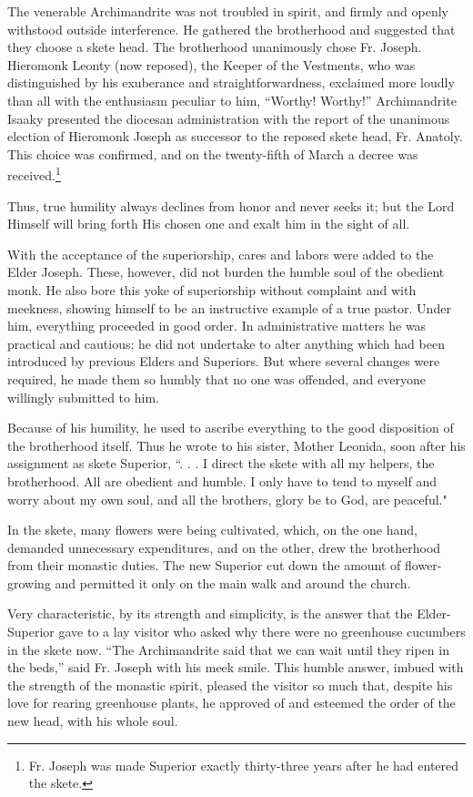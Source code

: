 The venerable Archimandrite was not troubled in spirit, and firmly and openly withstood outside interference. He gathered the brotherhood and suggested that they choose a skete head. The brotherhood unanimously chose Fr. Joseph. Hieromonk Leonty (now reposed), the Keeper of the Vestments, who was distinguished by his exuberance and straightforwardness, exclaimed more loudly than all with the enthusiasm peculiar to him, “Worthy! Worthy!” Archimandrite Isaaky presented the diocesan administration with the report of the unanimous election of Hieromonk Joseph as successor to the reposed skete head, Fr. Anatoly. This choice was confirmed, and on the twenty-fifth of March a decree was received.\footnote{Fr. Joseph was made Superior exactly thirty-three years after he had entered the skete.}

Thus, true humility always declines from honor and never seeks it; but the Lord Himself will bring forth His chosen one and exalt him in the sight of all.

With the acceptance of the superiorship, cares and labors were added to the Elder Joseph. These, however, did not burden the humble soul of the obedient monk. He also bore this yoke of superiorship without complaint and with meekness, showing himself to be an instructive example of a true pastor. Under him, everything proceeded in good order. In administrative matters he was practical and cautious; he did not undertake to alter anything which had been introduced by previous Elders and Superiors. But where several changes were required, he made them so humbly that no one was offended, and everyone willingly submitted to him.

Because of his humility, he used to ascribe everything to the good disposition of the brotherhood itself. Thus he wrote to his sister, Mother Leonida, soon after his assignment as skete Superior, ``. . . I direct the skete with all my helpers, the brotherhood. All are obedient and humble. I only have to tend to myself and worry about my own soul, and all the brothers, glory be to God, are peaceful."

In the skete, many flowers were being cultivated, which, on the one hand, demanded unnecessary expenditures, and on the other, drew the brotherhood from their monastic duties. The new Superior cut down the amount of flower-growing and permitted it only on the main walk and around the church.

Very characteristic, by its strength and simplicity, is the answer that the Elder-Superior gave to a lay visitor who asked why there were no greenhouse cucumbers in the skete now. “The Archimandrite said that we can wait until they ripen in the beds,” said Fr. Joseph with his meek smile. This humble answer, imbued with the strength of the monastic spirit, pleased the visitor so much that, despite his love for rearing greenhouse plants, he approved of and esteemed the order of the new head, with his whole soul.

